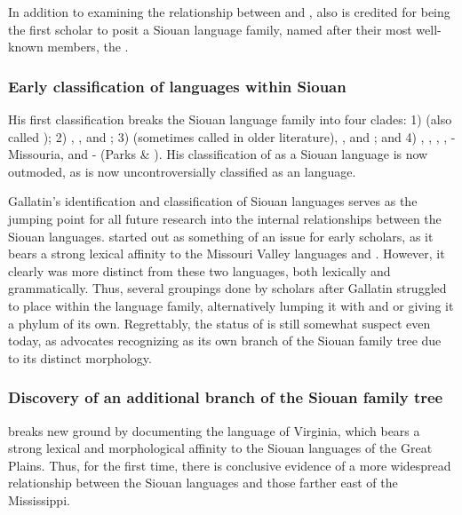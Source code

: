 \documentclass[output=paper]{LSP/langsci}
\begin{document}
In addition to examining the relationship between  and , \citet{Gallatin1836} also is credited for being the first scholar to posit a Siouan language family, named after their most well-known members, the . 

\subsubsection{Early classification of languages within Siouan}

His first classification breaks the Siouan language family into four clades: 1)  (also called ); 2) , , and ; 3)  (sometimes called  in older literature), , and ; and 4) , , , , -Missouria, and - (Parks \& \citealt{Rankin2001}). His classification of  as a Siouan language is now outmoded, as  is now uncontroversially classified as an  language.

Gallatin's \citeyear{Gallatin1836} identification and classification of Siouan languages serves as the jumping point for all future research into the internal relationships between the Siouan languages.  started out as something of an issue for early scholars, as it bears a strong lexical affinity to the Missouri Valley languages  and . However, it clearly was more distinct from these two languages, both lexically and grammatically. Thus, several groupings done by scholars after Gallatin struggled to place  within the language family, alternatively lumping it with  and  or giving it a phylum of its own. Regrettably, the status of  is still somewhat suspect even today, as \citet{Rankin2010} advocates recognizing  as its own branch of the Siouan family tree due to its distinct morphology.

\subsubsection{Discovery of an additional branch of the Siouan family tree} \citet{Hale1883} breaks new ground by documenting the  language of Virginia, which bears a strong lexical and morphological affinity to the Siouan languages of the Great Plains. Thus, for the first time, there is conclusive evidence of a more widespread relationship between the Siouan languages and those farther east of the Mississippi. 
\end{document}
